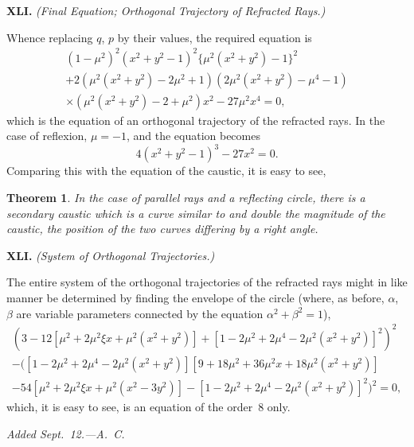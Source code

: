 \documentclass[11pt,a4paper]{book}
\newtheorem*{theorem}{Theorem}
\begin{document}
\begin{center}
\medskip\noindent\textbf{XLI.}
\textit{(Final Equation; Orthogonal Trajectory of Refracted Rays.)}

Whence replacing $q$, $p$ by their values, the required equation is
\begin{multline*}
(1 - \mu^{2})^{2} (x^{2} + y^{2} - 1)^{2}
\{ \mu^{2}(x^{2} + y^{2}) - 1 \}^{2} \\
+ 2(\mu^{2}(x^{2} + y^{2}) - 2\mu^{2} + 1)
(2\mu^{2}(x^{2} + y^{2}) - \mu^{4} - 1) \\
\times (\mu^{2}(x^{2} + y^{2}) - 2 + \mu^{2}) x^{2} - 27\mu^{2}x^{4} = 0,
\end{multline*}
which is the equation of an orthogonal trajectory of the refracted rays.
In the case of reflexion, $\mu = -1$, and the equation becomes
\[
4(x^{2} + y^{2} - 1)^{3} - 27x^{2} = 0.
\]
Comparing this with the equation of the caustic, it is easy to see,

\begin{theorem}
In the case of parallel rays and a reflecting circle, there is a
secondary caustic which is a curve similar to and double the
magnitude of the caustic, the position of the two curves differing
by a right angle.
\end{theorem}

\medskip\noindent\textbf{XLI.}
\textit{(System of Orthogonal Trajectories.)}

The entire system of the orthogonal trajectories of the refracted
rays might in like manner be determined by finding the envelope
of the circle (where, as before, $\alpha$, $\beta$ are variable parameters
connected by the equation $\alpha^{2} + \beta^{2} = 1$),
\begin{multline*}
(3 - 12[\mu^{2} + 2\mu^{2}\xi x + \mu^{2}(x^{2} + y^{2})]
+ [1 - 2\mu^{2} + 2\mu^{4} - 2\mu^{2}(x^{2} + y^{2})]^{2})^{2} \\
- ([1 - 2\mu^{2} + 2\mu^{4} - 2\mu^{2}(x^{2} + y^{2})]
[9 + 18\mu^{2} + 36\mu^{2}x + 18\mu^{2}(x^{2} + y^{2})] \\
- 54[\mu^{2} + 2\mu^{2}\xi x + \mu^{2}(x^{2} - 3y^{2})]
- [1 - 2\mu^{2} + 2\mu^{4} - 2\mu^{2}(x^{2} + y^{2})]^{2})^{2} = 0,
\end{multline*}
which, it is easy to see, is an equation of the order~8 only.

\vspace{1em}
\noindent\textit{Added Sept.\ 12.---A.~C.}

\newpage


\end{center}
\end{document}
